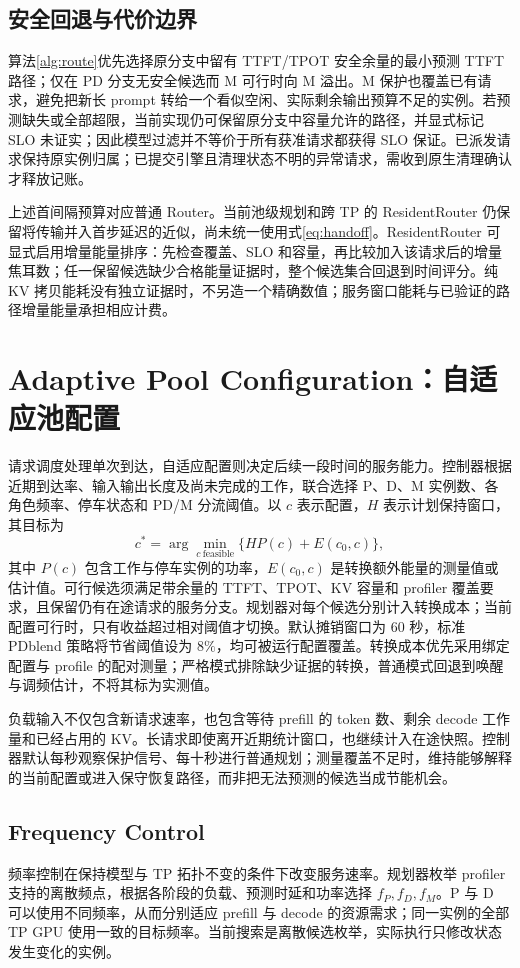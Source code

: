 \documentclass[11pt,a4paper,twocolumn]{article}
\begin{document}
\subsection{安全回退与代价边界}
算法\ref{alg:route}优先选择原分支中留有 TTFT/TPOT 安全余量的最小预测 TTFT 路径；仅在 PD 分支无安全候选而 M 可行时向 M 溢出。M 保护也覆盖已有请求，避免把新长 prompt 转给一个看似空闲、实际剩余输出预算不足的实例。若预测缺失或全部超限，当前实现仍可保留原分支中容量允许的路径，并显式标记 SLO 未证实；因此模型过滤并不等价于所有获准请求都获得 SLO 保证。已派发请求保持原实例归属；已提交引擎且清理状态不明的异常请求，需收到原生清理确认才释放记账。

上述首间隔预算对应普通 Router。当前池级规划和跨 TP 的 ResidentRouter 仍保留将传输并入首步延迟的近似，尚未统一使用式\eqref{eq:handoff}。ResidentRouter 可显式启用增量能量排序：先检查覆盖、SLO 和容量，再比较加入该请求后的增量焦耳数；任一保留候选缺少合格能量证据时，整个候选集合回退到时间评分。纯 KV 拷贝能耗没有独立证据时，不另造一个精确数值；服务窗口能耗与已验证的路径增量能量承担相应计费。

\section{Adaptive Pool Configuration：自适应池配置}
请求调度处理单次到达，自适应配置则决定后续一段时间的服务能力。控制器根据近期到达率、输入输出长度及尚未完成的工作，联合选择 P、D、M 实例数、各角色频率、停车状态和 PD/M 分流阈值。以 $c$ 表示配置，$H$ 表示计划保持窗口，其目标为
\begin{equation}
 c^*=\arg\min_{c\ \mathrm{feasible}}
       \{H P(c)+E(c_0,c)\},
 \label{eq:pool-objective}
\end{equation}
其中 $P(c)$ 包含工作与停车实例的功率，$E(c_0,c)$ 是转换额外能量的测量值或估计值。可行候选须满足带余量的 TTFT、TPOT、KV 容量和 profiler 覆盖要求，且保留仍有在途请求的服务分支。规划器对每个候选分别计入转换成本；当前配置可行时，只有收益超过相对阈值才切换。默认摊销窗口为 $60$ 秒，标准 PDblend 策略将节省阈值设为 $8\%$，均可被运行配置覆盖。转换成本优先采用绑定配置与 profile 的配对测量；严格模式排除缺少证据的转换，普通模式回退到唤醒与调频估计，不将其标为实测值。

负载输入不仅包含新请求速率，也包含等待 prefill 的 token 数、剩余 decode 工作量和已经占用的 KV。长请求即使离开近期统计窗口，也继续计入在途快照。控制器默认每秒观察保护信号、每十秒进行普通规划；测量覆盖不足时，维持能够解释的当前配置或进入保守恢复路径，而非把无法预测的候选当成节能机会。

\subsection{Frequency Control}
频率控制在保持模型与 TP 拓扑不变的条件下改变服务速率。规划器枚举 profiler 支持的离散频点，根据各阶段的负载、预测时延和功率选择 $f_P,f_D,f_M$。P 与 D 可以使用不同频率，从而分别适应 prefill 与 decode 的资源需求；同一实例的全部 TP GPU 使用一致的目标频率。当前搜索是离散候选枚举，实际执行只修改状态发生变化的实例。
\end{document}
